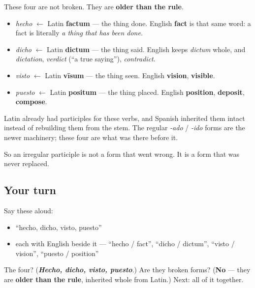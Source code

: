 \begin{cousinweb}
These four are not broken. They are \textbf{older than the rule}.

\begin{itemize}
\raggedright
  \item \emph{hecho} $\leftarrow$ Latin \textbf{factum} — the thing done. English \textbf{fact} is that same word: a fact is literally \emph{a thing that has been done}.
  \item \emph{dicho} $\leftarrow$ Latin \textbf{dictum} — the thing said. English keeps \emph{dictum} whole, and \emph{dictation}, \emph{verdict} (\textquotedblleft{}a true saying\textquotedblright{}), \emph{contradict}.
  \item \emph{visto} $\leftarrow$ Latin \textbf{vīsum} — the thing seen. English \textbf{vision}, \textbf{visible}.
  \item \emph{puesto} $\leftarrow$ Latin \textbf{positum} — the thing placed. English \textbf{position}, \textbf{deposit}, \textbf{compose}.
\end{itemize}

Latin already had participles for these verbs, and Spanish inherited them intact instead of rebuilding them from the stem. The regular \emph{-ado} / \emph{-ido} forms are the newer machinery; these four are what was there before it.

So an irregular participle is not a form that went wrong. It is a form that was never replaced.
\end{cousinweb}

\subsection*{Your turn}
Say these aloud:

\begin{itemize}
\raggedright
  \item \textquotedblleft{}hecho, dicho, visto, puesto\textquotedblright{}
  \item each with English beside it — \textquotedblleft{}hecho / fact\textquotedblright{}, \textquotedblleft{}dicho / dictum\textquotedblright{}, \textquotedblleft{}visto / vision\textquotedblright{}, \textquotedblleft{}puesto / position\textquotedblright{}
\end{itemize}

\begin{tcolorbox}[breakable,colback=teal!4,colframe=teal!35!black,title={Before you move on}]
The four? (\emph{\textbf{Hecho, dicho, visto, puesto}}.) Are they broken forms? (\textbf{No} — they are \textbf{older than the rule}, inherited whole from Latin.) Next: all of it together.
\end{tcolorbox}
